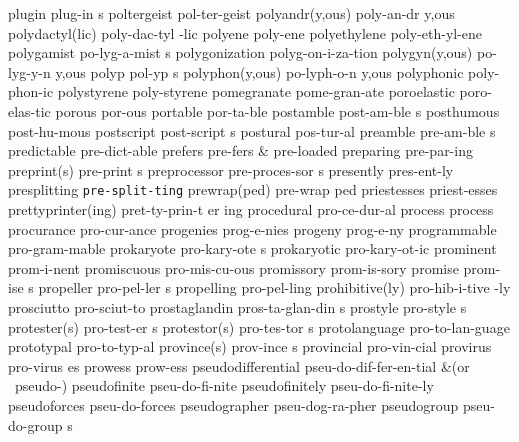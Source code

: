 \5 plugin		plug-in s	%
\1 poltergeist		pol-ter-geist
\2 polyandr(y,ous)	poly-an-dr y,ous	%
\2 polydactyl(lic)	poly-dac-tyl -lic	%
\1 polyene		poly-ene
\1 polyethylene		poly-eth-yl-ene
\5 polygamist		po-lyg-a-mist s
\1 polygonization	polyg-on-i-za-tion
\2 polygyn(y,ous)	po-lyg-y-n y,ous	%
\5 polyp		pol-yp s
\2 polyphon(y,ous)	po-lyph-o-n y,ous
\1 polyphonic		poly-phon-ic		%
\1 polystyrene		poly-styrene
\1 pomegranate		pome-gran-ate
\1 poroelastic		poro-elas-tic
\1 porous		por-ous
\1 portable		por-ta-ble		%
\5 postamble		post-am-ble s
\1 posthumous		post-hu-mous	%
\5 postscript		post-script s
\1 postural		pos-tur-al
\5 preamble		pre-am-ble s
\NewWordtrue
\1 predictable		pre-dict-able		%
\NewWordtrue
\1 prefers		pre-fers		%
 & pre-loaded \cr
\1 preparing		pre-par-ing
\2 preprint(s)		pre-print s
\5 preprocessor		pre-proces-sor s
\1 presently		pres-ent-ly		%
\1 presplitting 	{\tt\bs pre-split-ting}
\2 prewrap(ped)		pre-wrap ped		%
\1 priestesses		priest-esses
\3 prettyprinter(ing)	pret-ty-prin-t er ing
\1 procedural		pro-ce-dur-al
\1 process		process\thinspace*
\1 procurance		pro-cur-ance
\1 progenies		prog-e-nies
\1 progeny		prog-e-ny
\1 programmable		pro-gram-mable		%
\5 prokaryote		pro-kary-ote s 		%
\1 prokaryotic		pro-kary-ot-ic		%
\1 prominent		prom-i-nent		%
\1 promiscuous		pro-mis-cu-ous		%
\1 promissory		prom-is-sory		%
\5 promise		prom-ise s		%
\5 propeller		pro-pel-ler s		%
\1 propelling		pro-pel-ling		%
\2 prohibitive(ly)	pro-hib-i-tive -ly
\1 prosciutto		pro-sciut-to
\NewWordtrue
\5 prostaglandin	pros-ta-glan-din s 	%
\5 prostyle		pro-style s		%
\2 protester(s)		pro-test-er s
\2 protestor(s)		pro-tes-tor s
\1 protolanguage	pro-to-lan-guage     %
\1 prototypal		pro-to-typ-al
\2 province(s)		prov-ince s		%
\1 provincial		pro-vin-cial		%
\5 provirus		pro-virus es		%
\1 prowess		prow-ess		%
\1 pseudodifferential	pseu-do-dif-fer-en-tial
\tabalign {}		&\null\quad (or \ pseudo-{}) \cr
\1 pseudofinite 	pseu-do-fi-nite
\1 pseudofinitely	pseu-do-fi-nite-ly
\1 pseudoforces 	pseu-do-forces
\1 pseudographer	pseu-dog-ra-pher	%
\5 pseudogroup		pseu-do-group s		%
